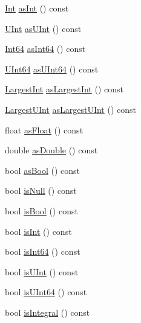 \begin{DoxyCompactItemize}
\item 
\hyperlink{class_json_1_1_value_abdf7a7ff73eb130ffcab28504ffdb405}{Int} \hyperlink{class_json_1_1_value_a614d635bc248a592593feb322cd15ab8}{as\+Int} () const
\item 
\hyperlink{class_json_1_1_value_a0933d59b45793ae4aade1757c322a98d}{U\+Int} \hyperlink{class_json_1_1_value_a74b305583ec3aacf4f9dd06e799dc265}{as\+U\+Int} () const
\item 
\hyperlink{class_json_1_1_value_a1b86af9f85f0f1baa972c3319fa22695}{Int64} \hyperlink{class_json_1_1_value_aa647ac4fe51a2e325c063ebe32262b44}{as\+Int64} () const
\item 
\hyperlink{class_json_1_1_value_a8b62564be8c087c6d18de180ff4e13e3}{U\+Int64} \hyperlink{class_json_1_1_value_a0e44a5a4cd0c099f9570dfa25813eb60}{as\+U\+Int64} () const
\item 
\hyperlink{class_json_1_1_value_a1cbb82642ed05109b9833e49f042ece7}{Largest\+Int} \hyperlink{class_json_1_1_value_ab16f2ea2a117a1b3b576acab8b6a700d}{as\+Largest\+Int} () const
\item 
\hyperlink{class_json_1_1_value_a6682a3684d635e03fc06ba229fa24eec}{Largest\+U\+Int} \hyperlink{class_json_1_1_value_ad03548101e0bf3d2d9eac75c64a0b8d7}{as\+Largest\+U\+Int} () const
\item 
float \hyperlink{class_json_1_1_value_af3a4d10bf575fabdc5440a7135c9649c}{as\+Float} () const
\item 
double \hyperlink{class_json_1_1_value_afd24002a18aef907ad746b1cb9eda0a2}{as\+Double} () const
\item 
bool \hyperlink{class_json_1_1_value_ab693fb7b9b1595bb0adc49658bbf780d}{as\+Bool} () const
\item 
bool \hyperlink{class_json_1_1_value_abde4070e21e46dc4f8203f66582cb19f}{is\+Null} () const
\item 
bool \hyperlink{class_json_1_1_value_ab1f02651cb89d0f18b63a036959391ba}{is\+Bool} () const
\item 
bool \hyperlink{class_json_1_1_value_aff51d8b52979ca06cf9d909accd5f695}{is\+Int} () const
\item 
bool \hyperlink{class_json_1_1_value_a4a81fb3c3acdbb68b2e2f30836a4f53e}{is\+Int64} () const
\item 
bool \hyperlink{class_json_1_1_value_abdda463d3269015f883587349726cfbc}{is\+U\+Int} () const
\item 
bool \hyperlink{class_json_1_1_value_a883576e35cb03a785258edb56777a2de}{is\+U\+Int64} () const
\item 
bool \hyperlink{class_json_1_1_value_ab6798954f6e80281cf22708ef45198a7}{is\+Integral} () const

\end{DoxyCompactItemize}
